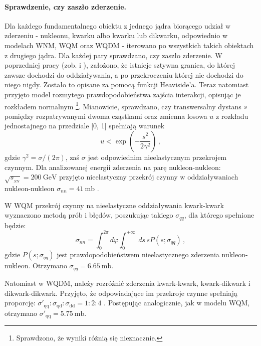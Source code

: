 \documentclass[a4paper,12pt]{article}
\begin{document}
\paragraph{Sprawdzenie, czy zaszło zderzenie.}
Dla każdego fundamentalnego obiektu z jednego jądra biorącego udział w zderzeniu - nukleonu, kwarku albo kwarku lub dikwarku, odpowiednio w modelach WNM, WQM oraz WQDM - iterowano po wszystkich takich obiektach z drugiego jądra. Dla każdej pary sprawdzano, czy zaszło zderzenie. W poprzedniej pracy (zob. \cite{Barej:pracaInz18} i \cite{Barej:2017kcw}), założono, że istnieje sztywna granica, do której zawsze dochodzi do oddziaływania, a po przekroczeniu której nie dochodzi do niego nigdy. Zostało to opisane za pomocą funkcji Heaviside'a. Teraz natomiast przyjęto model rozmytego prawdopodobieństwa zajścia interakcji, opisując je rozkładem normalnym \footnote{Sprawdzono, że wyniki różnią się nieznacznie.}. Mianowicie, sprawdzano, czy transwersalny dystans $s$ pomiędzy rozpatrywanymi dwoma cząstkami oraz zmienna losowa $u$ z rozkładu jednostajnego na przedziale [0, 1] spełniają warunek 
\begin{equation}
u < \exp\left(-\frac{s^2}{2\gamma^2}\right)\,,
\end{equation}
gdzie $\gamma^2 = \sigma/(2\pi)$, zaś $\sigma$ jest odpowiednim nieelastycznym przekrojem czynnym. Dla analizowanej energii zderzenia na parę nukleon-nukleon: $\sqrt{s_{_{NN}}} = 200~\text{GeV}$ przyjęto nieelastyczny przekrój czynny w oddziaływaniach nukleon-nukleon $\sigma_{nn} = 41~\text{mb}$ \cite{Loizides:2014vua}. 

W WQM przekrój czynny na nieelastyczne oddziaływania kwark-kwark wyznaczono metodą prób i błędów, poszukując takiego $\sigma_{qq}$, dla którego spełnione będzie: 
\begin{equation} 
\sigma_{nn} = \int_{0}^{2 \pi} d\varphi \int_{0}^{+ \infty}\:ds\,s P(s; \sigma_{qq})\,, 
\end{equation}
gdzie $P(s; \sigma_{qq})$ jest prawdopodobieństwem nieelastycznego zderzenia nukleon-nukleon. Otrzymano $\sigma_{qq} = 6.65~\text{mb}$.

Natomiast w WQDM, należy rozróżnić zderzenia kwark-kwark, kwark-dikwark i dikwark-dikwark. Przyjęto, że odpowiadające im przekroje czynne spełniają proporcję: $\sigma'_{\text{qq}}:\sigma_{\text{qd}}:\sigma_{\text{dd}}=1:2:4$ \cite{	Bialas:2006kw}. Postępując analogicznie, jak w modelu WQM, otrzymano $\sigma'_{\text{qq}} = 5.75~\text{mb}$.
\end{document}

